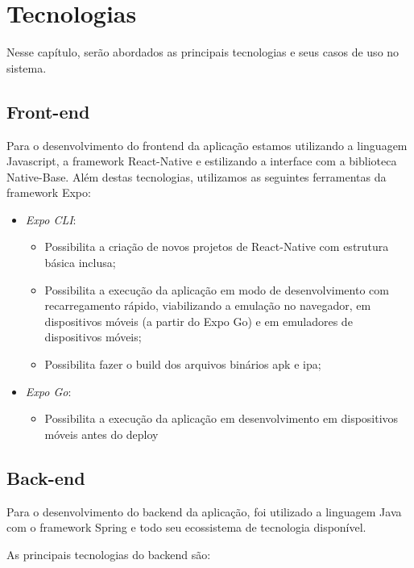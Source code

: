 \chapter{Tecnologias}

Nesse capítulo, serão abordados as principais tecnologias e seus casos de uso no sistema.

\section{Front-end}
Para o desenvolvimento do \gls{frontend} da aplicação estamos utilizando a linguagem Javascript, a \gls{framework} React-Native e estilizando a interface com a biblioteca Native-Base.
Além destas tecnologias, utilizamos as seguintes ferramentas da \gls{framework} Expo:

\begin{itemize}
	\item \textit{Expo CLI}:
		\begin{itemize}
			\item Possibilita a criação de novos projetos de React-Native com estrutura básica inclusa;
			\item Possibilita a execução da aplicação em modo de desenvolvimento com recarregamento rápido, viabilizando a emulação no navegador, em dispositivos móveis (a partir do Expo Go) e em emuladores de dispositivos móveis;
			
			\item Possibilita fazer o \gls{build} dos arquivos binários \gls{apk} e \gls{ipa};
		\end{itemize}
		
			\item \textit{Expo Go}:
		\begin{itemize}
			\item Possibilita a execução da aplicação em desenvolvimento em dispositivos móveis antes do \gls{deploy}
		\end{itemize}
\end{itemize}

\section{Back-end}
Para o desenvolvimento do backend da aplicação, foi utilizado a linguagem Java com o framework Spring e todo seu ecossistema de tecnologia disponível.

As principais tecnologias do backend são:

